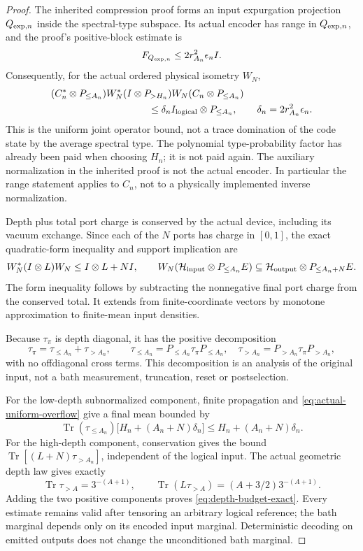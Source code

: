 \begin{proof}
The inherited compression proof forms an input expurgation projection
$Q_{{\rm exp},n}$ inside the spectral-type subspace. Its actual encoder
has range in $Q_{{\rm exp},n}$, and the proof's positive-block estimate is
\[
 F_{Q_{{\rm exp},n}}\le2r_{A_n}^{2}\epsilon_n I.
\]
Consequently, for the actual ordered physical isometry $W_N$,
\begin{align}
 &(C_n^*\otimes P_{\le A_n})W_N^*
   (I\otimes P_{>H_n})W_N(C_n\otimes P_{\le A_n})\notag\\
 &\hspace{35mm}\le\delta_n I_{\rm logical}\otimes P_{\le A_n},
 \qquad \delta_n=2r_{A_n}^{2}\epsilon_n.
 \label{eq:actual-uniform-overflow}
\end{align}
This is the uniform joint operator bound, not a trace domination of the
code state by the average spectral type. The polynomial type-probability
factor has already been paid when choosing $H_n$; it is not paid again.
The auxiliary normalization in the inherited proof is not the actual
encoder. In particular the range statement applies to $C_n$, not to a
physically implemented inverse normalization.

Depth plus total port charge is conserved by the actual device, including
its vacuum exchange. Since each of the $N$ ports has charge in $[0,1]$,
the exact quadratic-form inequality and support implication are
\[
 W_N^*(I\otimes L)W_N\le I\otimes L+NI,\qquad
 W_N(\mathcal H_{\rm input}\otimes P_{\le A_n}E)
 \subseteq\mathcal H_{\rm output}\otimes P_{\le A_n+N}E.
\]
The form inequality follows by subtracting the nonnegative final port
charge from the conserved total. It extends from finite-coordinate
vectors by monotone approximation to finite-mean input densities.

Because $\tau_\pi$ is depth diagonal, it has the positive decomposition
\[
 \tau_\pi=\tau_{\le A_n}+\tau_{>A_n},\qquad
 \tau_{\le A_n}=P_{\le A_n}\tau_\pi P_{\le A_n},
 \quad\tau_{>A_n}=P_{>A_n}\tau_\pi P_{>A_n},
\]
with no offdiagonal cross terms. This decomposition is an analysis of
the original input, not a bath measurement, truncation, reset or
postselection.

For the low-depth subnormalized component, finite propagation and
\eqref{eq:actual-uniform-overflow} give a final mean bounded by
\[
 \operatorname{Tr}(\tau_{\le A_n})
 \bigl[H_n+(A_n+N)\delta_n\bigr]
 \le H_n+(A_n+N)\delta_n.
\]
For the high-depth component, conservation gives the bound
$\operatorname{Tr}[(L+N)\tau_{>A_n}]$, independent of the logical input.
The actual geometric depth law gives exactly
\[
 \operatorname{Tr}\tau_{>A}=3^{-(A+1)},\qquad
 \operatorname{Tr}(L\tau_{>A})=(A+3/2)3^{-(A+1)}.
\]
Adding the two positive components proves
\eqref{eq:depth-budget-exact}. Every estimate remains valid after
tensoring an arbitrary logical reference; the bath marginal depends
only on its encoded input marginal. Deterministic decoding on emitted
outputs does not change the unconditioned bath marginal.


\end{proof}
